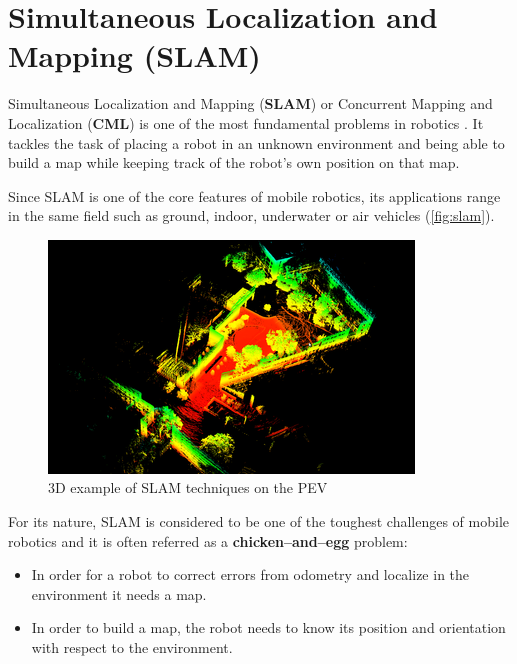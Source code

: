 
\chapter{Simultaneous Localization and Mapping (SLAM)}
\label{ch:slam}

Simultaneous Localization and Mapping (\textbf{SLAM}) or Concurrent Mapping and Localization (\textbf{CML}) is one of the most fundamental problems in robotics . It tackles the task of placing a robot in an unknown environment and being able to build a map while keeping track of the robot's own position on that map.

Since SLAM is one of the core features of mobile robotics, its applications range in the same field such as ground, indoor, underwater or air vehicles (\autoref {fig:slam}).
\begin{figure}[htb]
  \centering
  \includegraphics[width=\linewidth]{pictures/03/3dslam}
  \caption{3D example of SLAM techniques on the PEV}
  \label{fig:slam}
\end{figure}  


For its nature, SLAM is considered to be one of the toughest challenges of mobile robotics  and it is often referred as a \textbf{chicken--and--egg} problem:
\begin{itemize}
  \item In order for a robot to correct errors from odometry and localize in the environment it needs a map.

  \item In order to build a map, the robot needs to know its position and orientation with respect to the environment.
\end{itemize}

